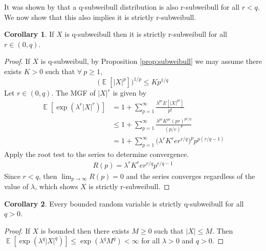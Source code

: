 \documentclass{article}
\theoremstyle{definition}
\newtheorem{corollary}{Corollary}[theorem]
\DeclareMathOperator{\E}{\mathbb{E}}
\begin{document}
It was shown by \cite{vladimirovaSubWeibullDistributionsGeneralizing2020} that a q-subweibull distribution is also r-subweibull for all $r<q$. We now show that this also implies it is strictly r-subweibull.

\begin{corollary}
\label{cor:strict-subweib}
If $X$ is q-subweibull then it is strictly r-subweibull for all $r\in (0,q)$. 
\end{corollary}
\begin{proof}
If $X$ is q-subweibull, by Proposition \ref{prop:subweibull} we may assume there exists $K>0$ such that $\forall~p\geq 1$,
\[\big(\E[\vert X\vert^p]\big)^{1/p}\leq K p^{1/q}\]
Let $r\in (0,q)$. The MGF of $\vert X\vert^r$ is given by
\begin{align*}
\E\left[\exp(\lambda^r \vert X\vert^r)\right] &= 1+\sum_{p=1}^\infty \frac{\lambda^{pr} E[\vert X\vert^{pr}]}{p!}\\
&\leq 1+\sum_{p=1}^\infty \frac{\lambda^{pr}K^{pr} (pr)^{pr/q}}{(p/e)^p}\\ 
&= 1+\sum_{p=1}^\infty \big(\lambda^r K^r e r^{r/q}\big)^p p^{p(r/q-1)}
\end{align*}
Apply the root test to the series to determine convergence.
\begin{align*}
R(p) = \lambda^r K^r e r^{r/q} p^{r/q-1}
\end{align*}
Since $r<q$, then $\lim_{p\to\infty} R(p) = 0$ and the series converges regardless of the value of $\lambda$, which shows $X$ is strictly r-subweibull.
\end{proof}

\begin{corollary}
\label{cor:bounded-subweib}
Every bounded random variable is strictly q-subweibull for all $q>0$.
\end{corollary}
\begin{proof}
If $X$ is bounded then there exists $M\geq 0$ such that $\vert X\vert \leq M$. Then $\E[\exp(\lambda^q\vert X\vert^q)]\leq \exp(\lambda^q M^q)<\infty$ for all $\lambda>0$ and $q>0$.
\end{proof}
\end{document}
